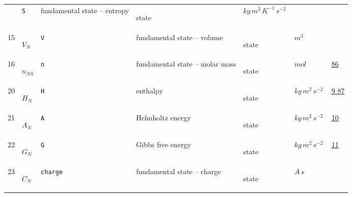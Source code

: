 \begin{longtable}{|p{1cm}|p{2.5cm}|p{4.5cm}|p{8cm}|p{3.0cm}|p{3cm}|p{1cm}|}
             & \verb|S|
             & fundamental state -- entropy
             & \begin{lay}state \end{lay}
             & $ kg \,m^{2} \,K^{-1} \,s^{-2} \, $
             & \\
            15
             & \hypertarget{"v:15"}{ $ {V}{_{N}} $}
             & \verb|V|
             & fundamental state -- volume
             & \begin{lay}state \end{lay}
             & $ m^{3} \, $
             & \\
            16
             & \hypertarget{"v:16"}{ $ {n}{_{{N S}}} $}
             & \verb|n|
             & fundamental state -- molar mass
             & \begin{lay}state \end{lay}
             & $ mol \, $
             &                 \hyperlink{"e:86"}{ 86 }
                 \\
            20
             & \hypertarget{"v:20"}{ $ {H}{_{N}} $}
             & \verb|H|
             & enthalpy
             & \begin{lay}state \end{lay}
             & $ kg \,m^{2} \,s^{-2} \, $
             &                 \hyperlink{"e:9"}{ 9 }
                                 \hyperlink{"e:87"}{ 87 }
                 \\
            21
             & \hypertarget{"v:21"}{ $ {A}{_{N}} $}
             & \verb|A|
             & Helmholtz energy
             & \begin{lay}state \end{lay}
             & $ kg \,m^{2} \,s^{-2} \, $
             &                 \hyperlink{"e:10"}{ 10 }
                 \\
            22
             & \hypertarget{"v:22"}{ $ {G}{_{N}} $}
             & \verb|G|
             & Gibbs free energy
             & \begin{lay}state \end{lay}
             & $ kg \,m^{2} \,s^{-2} \, $
             &                 \hyperlink{"e:11"}{ 11 }
                 \\
            23
             & \hypertarget{"v:23"}{ $ {C}{_{N}} $}
             & \verb|charge|
             & fundamental state -- charge
             & \begin{lay}state \end{lay}
             & $ A \,s \, $
             & \\

\end{longtable}
